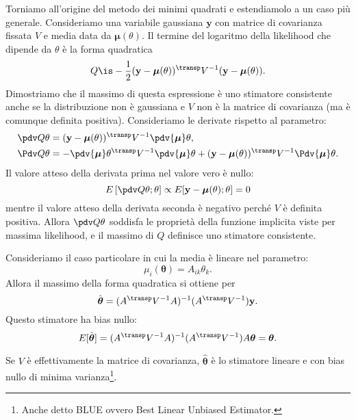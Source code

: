 Torniamo all'origine del metodo dei minimi quadrati e estendiamolo a un caso più generale.
Consideriamo una variabile gaussiana $\mathbf y$ con matrice di covarianza fissata $V$ e media data da $\boldsymbol\mu(\theta)$.
Il termine del logaritmo della likelihood che dipende da $\theta$ è la forma quadratica
\begin{equation*}
	Q \is -\frac 12 (\mathbf y - \boldsymbol\mu(\theta))^\transp V^{-1} (\mathbf y - \boldsymbol\mu(\theta)).
\end{equation*}
Dimostriamo che il massimo di questa espressione è uno stimatore consistente anche se la distribuzione non è gaussiana e $V$ non è la matrice di covarianza (ma è comunque definita positiva).
Consideriamo le derivate rispetto al parametro:
\begin{align*}
	\pdv Q\theta
	&= (\mathbf y - \boldsymbol\mu(\theta))^\transp V^{-1} \pdv{\boldsymbol\mu}\theta, \\
	\Pdv Q\theta
	&= - \pdv{\boldsymbol\mu}\theta^\transp V^{-1} \pdv{\boldsymbol\mu}\theta
	+ (\mathbf y - \boldsymbol\mu(\theta))^\transp V^{-1} \Pdv{\boldsymbol\mu}\theta.
\end{align*}
Il valore atteso della derivata prima nel valore vero è nullo:
\begin{equation*}
	E\left[\pdv Q\theta;\theta\right]
	\propto E[\mathbf y - \boldsymbol\mu(\theta);\theta] = 0
\end{equation*}
mentre il valore atteso della derivata seconda è negativo perché $V$ è definita positiva.
Allora $\pdv Q\theta$ soddisfa le proprietà della funzione implicita viste per massima likelihood,
%
e il massimo di $Q$ definisce uno stimatore consistente.

Consideriamo il caso particolare in cui la media è lineare nel parametro:
\begin{equation*}
	\mu_i(\boldsymbol\theta) = A_{ik} \theta_k.
\end{equation*}
Allora il massimo della forma quadratica si ottiene per
\begin{equation*}
	\hat{\boldsymbol\theta} = (A^\transp V^{-1} A)^{-1} (A^\transp V^{-1}) \mathbf y.
\end{equation*}
Questo stimatore ha bias nullo:
\begin{equation*}
	E[\hat{\boldsymbol\theta}]
	= (A^\transp V^{-1} A)^{-1} (A^\transp V^{-1}) A \boldsymbol\theta
	= \boldsymbol\theta.
\end{equation*}
\begin{fact}
	Se $V$ è effettivamente la matrice di covarianza,
	$\hat{\boldsymbol\theta}$ è lo stimatore lineare e con bias nullo di minima varianza\footnote{Anche detto BLUE ovvero Best Linear Unbiased Estimator.}.
\end{fact}
